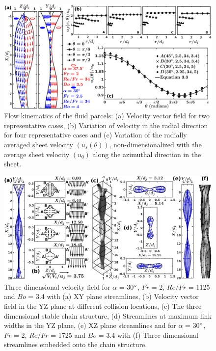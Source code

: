 \documentclass{jfm}
\begin{document}
\begin{figure}
	\centering
	\includegraphics[width=\linewidth]{Figure4}
	\caption{Flow kinematics of the fluid parcels: (a) Velocity vector field for two representative cases, (b) Variation of velocity in the radial direction for four representative cases and (c) Variation of the radially averaged sheet velocity $\left(u_s(\theta)\right)$, non-dimensionalized with the average sheet velocity $\left(u_0\right)$ along the azimuthal direction in the sheet.}
	\label{Figure::velocityVectors}%
\end{figure}
\begin{figure}
	\centering
	\includegraphics[width=\linewidth]{Figure5}
	\caption{Three dimensional velocity field for $\alpha$ = 30$\degree$, $Fr$ = 2,  $Re/Fr$ = 1125 and $Bo$ = 3.4 with (a) XY plane streamlines, (b) Velocity vector field in the YZ plane at different collision locations, (c) The three dimensional stable chain structure, (d) Streamlines at maximum link widths in the YZ plane, (e) XZ plane streamlines and for $\alpha$ = 30$\degree$, $Fr$ = 2,  $Re/Fr$ = 1725 and $Bo$ = 3.4 with (f) Three dimensional streamlines embedded onto the chain structure.}
	\label{Figure::streamDetails}%
\end{figure}
\end{document}
